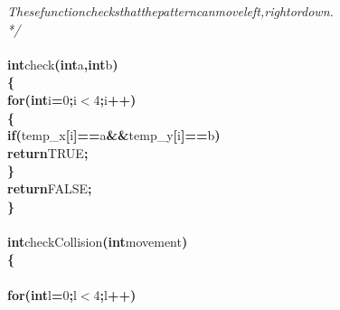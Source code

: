\documentclass[a4paper, 10pt]{article}
\newcommand\SPC{\hspace*{0.6em}}
\newcommand\HYP{\mbox{\char 45}}
\newcommand{\CppAComment}[1]{\textit{\textcolor[rgb]{0.2,0.6,1}{#1}}}
\newcommand{\CppAIdentifier}[1]{#1}
\newcommand{\CppANumber}[1]{\textcolor[rgb]{0.5,0,0.5}{#1}}
\newcommand{\CppAReservedWord}[1]{\textbf{#1}}
\newcommand{\CppASpace}[1]{\colorbox[rgb]{1,1,1}{#1}}
\newcommand{\CppASymbol}[1]{\textbf{\textcolor[rgb]{1,0,0}{#1}}}
\begin{document}
\begin{ttfamily}
\CppAComment{\SPC \SPC \SPC \SPC These\SPC function\SPC checks\SPC that\SPC the\SPC pattern\SPC can\SPC move\SPC left,\SPC right\SPC or\SPC down.}\\
\CppAComment{\HYP \HYP \HYP \HYP \HYP \HYP \HYP \HYP \HYP \HYP \HYP \HYP \HYP \HYP \HYP \HYP \HYP \HYP \HYP \HYP \HYP \HYP \HYP \HYP \HYP \HYP \HYP \HYP \HYP \HYP \HYP \HYP \HYP \HYP \HYP \HYP \HYP \HYP \HYP \HYP \HYP \HYP \HYP \HYP \HYP \HYP \HYP \HYP \HYP \HYP \HYP \HYP \HYP \HYP \HYP \HYP \HYP \HYP \HYP \HYP \HYP \HYP \HYP \HYP \HYP \HYP \HYP \HYP \HYP \HYP \HYP \HYP \HYP \HYP \HYP \HYP \HYP \HYP \HYP \HYP \HYP */}\\
\\
\CppAReservedWord{int}\CppASpace{\SPC }\CppAIdentifier{check}\CppASymbol{(}\CppAReservedWord{int}\CppASpace{\SPC }\CppAIdentifier{a}\CppASymbol{,}\CppASpace{\SPC }\CppAReservedWord{int}\CppASpace{\SPC }\CppAIdentifier{b}\CppASymbol{)}\\
\CppASymbol{\{}\\
\CppASpace{\SPC }\CppAReservedWord{for}\CppASymbol{(}\CppAReservedWord{int}\CppASpace{\SPC }\CppAIdentifier{i}\CppASymbol{=}\CppANumber{0}\CppASymbol{;}\CppAIdentifier{i}\CppASymbol{$<$}\CppANumber{4}\CppASymbol{;}\CppAIdentifier{i}\CppASymbol{++}\CppASymbol{)}\\
\CppASpace{\SPC }\CppASymbol{\{}\\
\CppASpace{\SPC \SPC }\CppAReservedWord{if}\CppASymbol{(}\CppAIdentifier{temp\_x}\CppASymbol{[}\CppAIdentifier{i}\CppASymbol{]}\CppASymbol{==}\CppAIdentifier{a}\CppASymbol{\&\&}\CppAIdentifier{temp\_y}\CppASymbol{[}\CppAIdentifier{i}\CppASymbol{]}\CppASymbol{==}\CppAIdentifier{b}\CppASymbol{)}\\
\CppASpace{\SPC \SPC \SPC }\CppAReservedWord{return}\CppASpace{\SPC }\CppAIdentifier{TRUE}\CppASymbol{;}\\
\CppASpace{\SPC }\CppASymbol{\}}\\
\CppASpace{\SPC }\CppAReservedWord{return}\CppASpace{\SPC }\CppAIdentifier{FALSE}\CppASymbol{;}\\
\CppASymbol{\}}\\
\\
\CppAReservedWord{int}\CppASpace{\SPC }\CppAIdentifier{checkCollision}\CppASymbol{(}\CppAReservedWord{int}\CppASpace{\SPC }\CppAIdentifier{movement}\CppASymbol{)}\\
\CppASymbol{\{}\\
\\
\CppASpace{\SPC }\CppAReservedWord{for}\CppASymbol{(}\CppAReservedWord{int}\CppASpace{\SPC }\CppAIdentifier{l}\CppASymbol{=}\CppANumber{0}\CppASymbol{;}\CppAIdentifier{l}\CppASymbol{$<$}\CppANumber{4}\CppASymbol{;}\CppAIdentifier{l}\CppASymbol{++}\CppASymbol{)}\\

\end{ttfamily}
\end{document}
